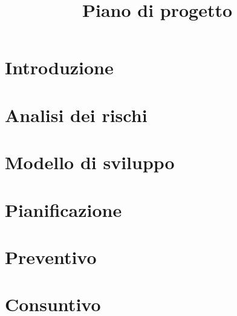 \documentclass{article}
\title{Piano di progetto}
\begin{document}


\section{Introduzione}%
\label{sec:introduzione}

\newpage
\section{Analisi dei rischi}%
\label{sec:analisi_dei_rischi}

\newpage
\section{Modello di sviluppo}%
\label{sec:modello_di_sviluppo}

\newpage
\section{Pianificazione}%
\label{sec:pianificazione}

\newpage
\section{Preventivo}%
\label{sec:preventivo}

\newpage
\section{Consuntivo}%
\label{sec:consuntivo}

\end{document}

